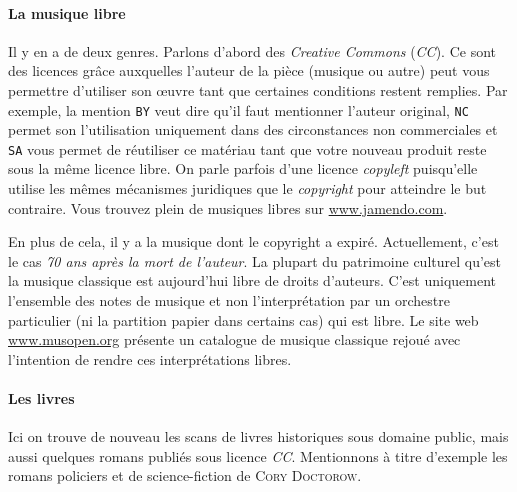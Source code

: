 \documentclass[10pt]{../fiche}
\begin{document}
\paragraph{La musique libre}
Il y en a de deux genres. Parlons d'abord des \textit{Creative Commons} (\textit{CC}). Ce sont des licences grâce auxquelles l'auteur de la pièce (musique ou autre) peut vous permettre
d'utiliser son \oe uvre tant que certaines conditions restent remplies. Par exemple, la mention \texttt{BY} veut dire qu'il faut mentionner l'auteur original, \texttt{NC} permet son l'utilisation
uniquement dans des circonstances non commerciales et \texttt{SA} vous permet de réutiliser ce matériau tant que votre nouveau produit reste sous la même licence libre.
On parle parfois d'une licence \textit{copyleft} puisqu'elle utilise les mêmes mécanismes juridiques que le \textit{copyright} pour atteindre le but contraire. Vous trouvez plein de musiques libres sur \url{www.jamendo.com}.

En plus de cela, il y a la musique dont le copyright a expiré. Actuellement, c'est le cas \textit{70 ans après la mort de l'auteur}.
La plupart du patrimoine culturel qu'est la musique classique est aujourd'hui libre de droits d'auteurs.
C'est uniquement l'ensemble des notes de musique et non l'interprétation par un orchestre particulier (ni la partition papier dans certains cas) qui est libre.
Le site web \url{www.musopen.org} présente un catalogue de musique classique rejoué avec l'intention de rendre ces interprétations libres.

\paragraph{Les livres}
Ici on trouve de nouveau les scans de livres historiques sous domaine public, mais aussi quelques romans publiés sous licence \textit{CC}.
Mentionnons à titre d'exemple les romans policiers et de science-fiction de \textsc{Cory Doctorow}.
\end{document}
